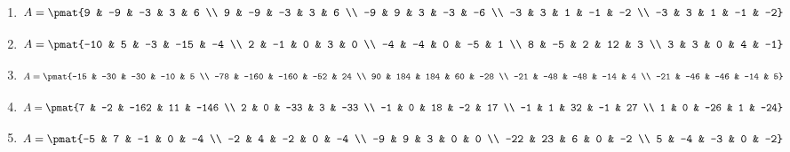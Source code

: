 \begin{enumerate}
\item

\begin{align*}
A = \pmat{9 & -9 & -3 & 3 & 6 \\ 9 & -9 & -3 & 3 & 6 \\ -9 & 9 & 3 & -3 & -6 \\ -3 & 3 & 1 & -1 & -2 \\ -3 & 3 & 1 & -1 & -2}
\end{align*}

\item

\begin{align*}
A = \pmat{-10 & 5 & -3 & -15 & -4 \\ 2 & -1 & 0 & 3 & 0 \\ -4 & -4 & 0 & -5 & 1 \\ 8 & -5 & 2 & 12 & 3 \\ 3 & 3 & 0 & 4 & -1}
\end{align*}

\item

\begin{align*}
A = \pmat{-15 & -30 & -30 & -10 & 5 \\ -78 & -160 & -160 & -52 & 24 \\ 90 & 184 & 184 & 60 & -28 \\ -21 & -48 & -48 & -14 & 4 \\ -21 & -46 & -46 & -14 & 5}
\end{align*}

\item

\begin{align*}
A = \pmat{7 & -2 & -162 & 11 & -146 \\ 2 & 0 & -33 & 3 & -33 \\ -1 & 0 & 18 & -2 & 17 \\ -1 & 1 & 32 & -1 & 27 \\ 1 & 0 & -26 & 1 & -24}
\end{align*}

\item

\begin{align*}
A = \pmat{-5 & 7 & -1 & 0 & -4 \\ -2 & 4 & -2 & 0 & -4 \\ -9 & 9 & 3 & 0 & 0 \\ -22 & 23 & 6 & 0 & -2 \\ 5 & -4 & -3 & 0 & -2}
\end{align*}


\end{enumerate}
